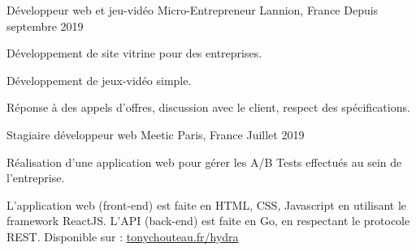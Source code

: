 

\begin{cventries}

  \cventry
    {Développeur web et jeu-vidéo} %
    {Micro-Entrepreneur} %
    {Lannion, France} %
    {Depuis septembre 2019} %
    {
      \begin{cvitems} %
        \item {Développement de site vitrine pour des entreprises.}
        \item {Développement de jeux-vidéo simple.}
        \item {Réponse à des appels d'offres, discussion avec le client, respect des spécifications.}
      \end{cvitems}
    }

  \cventry
    {Stagiaire développeur web} %
    {Meetic} %
    {Paris, France} %
    {Juillet 2019} %
    {
      \begin{cvitems} %
        \item {Réalisation d'une application web pour gérer les A/B Tests effectués au sein de l'entreprise.}
        \item {L'application web (front-end) est faite en HTML, CSS, Javascript en utilisant le framework ReactJS. L'API (back-end) est faite en Go, en respectant le protocole REST. Disponible sur : \href{https://www.tonychouteau.fr/hydra}{tonychouteau.fr/hydra}}
      \end{cvitems}
    }

\end{cventries}
